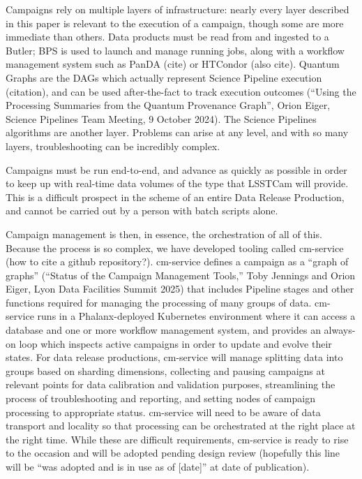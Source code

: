 		Campaigns rely on multiple layers of infrastructure: nearly every layer described in this paper is relevant to the execution of a campaign, though some are more immediate than others.
		Data products must be read from and ingested to a Butler; BPS is used to launch and manage running jobs, along with a workflow management system such as PanDA (cite) or HTCondor (also cite).
		Quantum Graphs are the DAGs which actually represent Science Pipeline execution (citation), and can be used after-the-fact to track execution outcomes (``Using the Processing Summaries from the Quantum Provenance Graph'', Orion Eiger, Science Pipelines Team Meeting, 9 October 2024).
		The Science Pipelines algorithms are another layer.
		Problems can arise at any level, and with so many layers, troubleshooting can be incredibly complex.

		Campaigns must be run end-to-end, and advance as quickly as possible in order to keep up with real-time data volumes of the type that LSSTCam will provide.
		This is a difficult prospect in the scheme of an entire Data Release Production, and cannot be carried out by a person with batch scripts alone.

		Campaign management is then, in essence, the orchestration of all of this.
		Because the process is so complex, we have developed tooling called cm-service (how to cite a github repository?). cm-service defines a campaign as a ``graph of graphs'' (``Status of the Campaign Management Tools,'' Toby Jennings and Orion Eiger, Lyon Data Facilities Summit 2025) that includes Pipeline stages and other functions required for managing the processing of many groups of data.
		cm-service runs in a Phalanx-deployed Kubernetes environment where it can access a database and one or more workflow management system, and provides an always-on loop which inspects active campaigns in order to update and evolve their states.
		For data release productions, cm-service will manage splitting data into groups based on sharding dimensions, collecting and pausing campaigns at relevant points for data calibration and validation purposes, streamlining the process of troubleshooting and reporting, and setting nodes of campaign processing to appropriate status.
		cm-service will need to be aware of data transport and locality so that processing can be orchestrated at the right place at the right time.
		While these are difficult requirements, cm-service is ready to rise to the occasion and will be adopted pending design review (hopefully this line will be ``was adopted and is in use as of [date]'' at date of publication).

